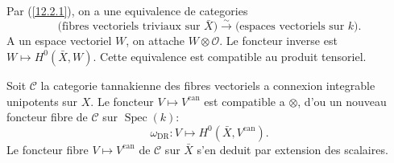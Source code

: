 \documentclass[12pt,a4paper]{article}
\theoremstyle{plain}
\theoremstyle{definition}
\theoremstyle{remark}
\DeclareMathOperator{\Spec}{Spec}
\newcommand{\DR}{\mathrm{DR}}
\newcommand{\can}{\mathrm{can}}
\begin{document}
Par (\ref{12.2.1}), on a une equivalence de categories
$$\text{(fibres vectoriels triviaux sur } \bar{X}\text{)} \xrightarrow{\sim} \text{(espaces vectoriels sur } k\text{)}.$$
A un espace vectoriel $W$, on attache $W \otimes \mathcal{O}$. Le foncteur inverse est $W \mapsto H^0(\bar{X}, W)$. Cette equivalence est compatible au produit tensoriel.

Soit $\mathcal{C}$ la categorie tannakienne des fibres vectoriels a connexion integrable unipotents sur $X$. Le foncteur $V \mapsto V^{\can}$ est compatible a $\otimes$, d'ou un nouveau foncteur fibre de $\mathcal{C}$ sur $\Spec(k)$:
\begin{equation}\label{12.4.1}
\omega_{\DR}: V \longmapsto H^0(\bar{X}, V^{\can}). \tag{12.4.1}
\end{equation}
Le foncteur fibre $V \mapsto V^{\can}$ de $\mathcal{C}$ sur $\bar{X}$ s'en deduit par extension des scalaires.
\end{document}
